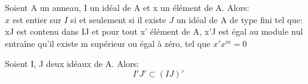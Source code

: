 \begin{maproposition}
	Soient A un anneau, I un idéal de A et x un élément de A. Alors:\\
	$x$ est entier sur $I$ si et seulement si il existe $J$ un idéal de A de type fini tel que: xJ est contenu dans IJ et pour tout x' élément de A, x'J est égal au module nul entraîne qu'il existe m supérieur ou égal à zéro, tel que $x'x^m = 0$
\end{maproposition}
\begin{moncorollaire}
	Soient I, J deux idéaux de A. Alors:
	\[ I'J' \subset (IJ)' \]
\end{moncorollaire}
